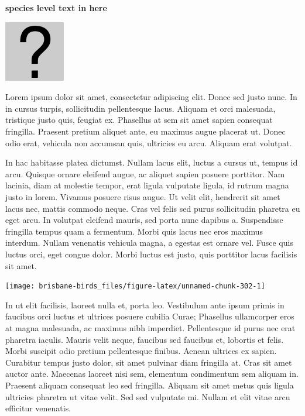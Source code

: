 \documentclass[]{book}
\let\origfigure\figure
\let\endorigfigure\endfigure
\renewenvironment{figure}[1][2] {
  \expandafter\origfigure\expandafter[H]
} {
  \endorigfigure
}
\begin{document}
\textbf{species level text in here}

\begin{figure}
\centering
\includegraphics{assets/missing.png}
\caption{No image for species}
\end{figure}

Lorem ipsum dolor sit amet, consectetur adipiscing elit. Donec sed justo
nunc. In in cursus turpis, sollicitudin pellentesque lacus. Aliquam et
orci malesuada, tristique justo quis, feugiat ex. Phasellus at sem sit
amet sapien consequat fringilla. Praesent pretium aliquet ante, eu
maximus augue placerat ut. Donec odio erat, vehicula non accumsan quis,
ultricies eu arcu. Aliquam erat volutpat.

In hac habitasse platea dictumst. Nullam lacus elit, luctus a cursus ut,
tempus id arcu. Quisque ornare eleifend augue, ac aliquet sapien posuere
porttitor. Nam lacinia, diam at molestie tempor, erat ligula vulputate
ligula, id rutrum magna justo in lorem. Vivamus posuere risus augue. Ut
velit elit, hendrerit sit amet lacus nec, mattis commodo neque. Cras vel
felis sed purus sollicitudin pharetra eu eget arcu. In volutpat eleifend
mauris, sed porta nunc dapibus a. Suspendisse fringilla tempus quam a
fermentum. Morbi quis lacus nec eros maximus interdum. Nullam venenatis
vehicula magna, a egestas est ornare vel. Fusce quis luctus orci, eget
congue dolor. Morbi luctus est justo, quis porttitor lacus facilisis sit
amet.

\begin{figure}
\texttt{[image: brisbane-birds\_files/figure-latex/unnamed-chunk-302-1]} \caption{insert figure caption}\label{fig:unnamed-chunk-302}
\end{figure}

In ut elit facilisis, laoreet nulla et, porta leo. Vestibulum ante ipsum
primis in faucibus orci luctus et ultrices posuere cubilia Curae;
Phasellus ullamcorper eros at magna malesuada, ac maximus nibh
imperdiet. Pellentesque id purus nec erat pharetra iaculis. Mauris velit
neque, faucibus sed faucibus et, lobortis et felis. Morbi suscipit odio
pretium pellentesque finibus. Aenean ultrices ex sapien. Curabitur
tempus justo dolor, sit amet pulvinar diam fringilla at. Cras sit amet
auctor ante. Maecenas laoreet nisi sem, elementum condimentum sem
aliquam in. Praesent aliquam consequat leo sed fringilla. Aliquam sit
amet metus quis ligula ultricies pharetra ut vitae velit. Sed sed
vulputate mi. Nullam et elit vitae arcu efficitur venenatis.
\end{document}
